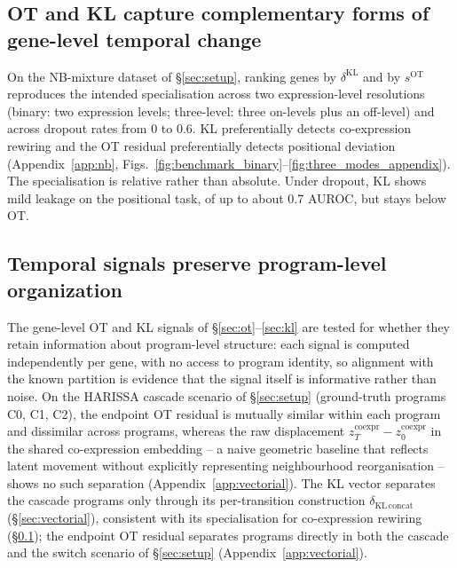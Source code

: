 \documentclass[10pt, letterpaper]{article}
\newcommand{\zco}{z^{\mathrm{coexpr}}}
\newcommand{\dKL}{\delta^{\mathrm{KL}}}
\begin{document}
\subsection{OT and KL capture complementary forms of gene-level temporal change}
\label{sec:complementarity}

On the NB-mixture dataset of \S\ref{sec:setup}, ranking genes by $\dKL$ and by $s^{\mathrm{OT}}$
reproduces the intended specialisation across two expression-level resolutions (binary: two expression levels; three-level: three on-levels plus an off-level) and across dropout rates from 0 to 0.6. KL preferentially detects co-expression rewiring and the OT residual
preferentially detects positional deviation (Appendix~\ref{app:nb},
Figs.~\ref{fig:benchmark_binary}--\ref{fig:three_modes_appendix}). The specialisation is relative rather than absolute. Under dropout, KL shows mild leakage on the positional task,
of up to about 0.7 AUROC, but stays below OT.

\subsection{Temporal signals preserve program-level organization}
\label{sec:program-recovery}

The gene-level OT and KL signals of \S\ref{sec:ot}--\ref{sec:kl} are tested for whether they retain information about program-level structure: each signal is computed independently per gene, with no access to program identity, so alignment with the known partition is evidence that the signal itself is informative rather than noise. On the HARISSA cascade scenario of \S\ref{sec:setup} (ground-truth programs C0, C1, C2), the endpoint OT residual is mutually similar within each program and dissimilar across programs, whereas the raw displacement $\zco_{T}-\zco_{0}$ in the shared co-expression embedding -- a naive geometric baseline that reflects latent movement without explicitly representing neighbourhood reorganisation -- shows no such separation (Appendix~\ref{app:vectorial}). The KL vector separates the cascade programs only through its per-transition construction $\delta_{\mathrm{KL\,concat}}$ (\S\ref{sec:vectorial}), consistent with its specialisation for co-expression rewiring (\S\ref{sec:complementarity}); the endpoint OT residual separates programs directly in both the cascade and the switch scenario of \S\ref{sec:setup} (Appendix~\ref{app:vectorial}).
\end{document}
